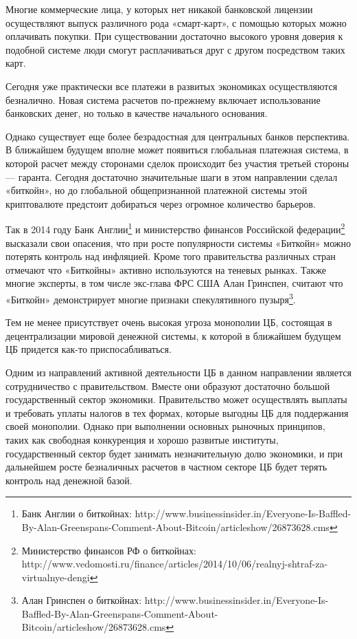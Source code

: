 \documentclass[14pt,a4paper, oneside]{extreport}
\begin{document}
Многие коммерческие лица, у которых нет никакой банковской лицензии осуществляют выпуск различного рода «смарт-карт», с помощью которых можно оплачивать покупки. При существовании достаточно высокого уровня доверия к подобной системе люди смогут расплачиваться друг с другом посредством таких карт.  

Сегодня уже практически все платежи в развитых экономиках осуществляются безналично. Новая система расчетов  по-прежнему включает использование банковских денег, но только в качестве начального основания. 

Однако существует еще более безрадостная для центральных банков перспектива. В ближайшем будущем вполне может появиться глобальная платежная система, в которой расчет между сторонами сделок происходит без участия третьей стороны --- гаранта. Сегодня достаточно значительные шаги в этом направлении сделал «биткойн», но до глобальной общепризнанной платежной системы этой криптовалюте предстоит добираться через огромное количество барьеров.

Так в 2014 году Банк Англии\footnote{ Банк Англии о биткойнах: http://www.businessinsider.in/Everyone-Is-Baffled-By-Alan-Greenspans-Comment-About-Bitcoin/articleshow/26873628.cms} и министерство финансов Российской федерации\footnote{Министерство финансов РФ о биткойнах: http://www.vedomosti.ru/finance/articles/2014/10/06/realnyj-shtraf-za-virtualnye-dengi} высказали свои опасения, что при росте популярности системы «Биткойн»  можно потерять контроль над инфляцией.  Кроме того  правительства различных стран отмечают что «Биткойны» активно используются на теневых рынках. Также многие эксперты, в том числе экс-глава ФРС США Алан Гринспен, считают что «Биткойн» демонстрирует многие признаки спекулятивного пузыря\footnote{Алан Гринспен о биткойнах: http://www.businessinsider.in/Everyone-Is-Baffled-By-Alan-Greenspans-Comment-About-Bitcoin/articleshow/26873628.cms}.

Тем не менее присутствует очень высокая угроза монополии ЦБ, состоящая в децентрализации мировой денежной системы, к которой в ближайшем будущем ЦБ придется как-то приспосабливаться.

Одним из направлений активной деятельности ЦБ в данном направлении является сотрудничество с правительством. Вместе они образуют достаточно большой государственный сектор экономики. Правительство может осуществлять выплаты и требовать уплаты налогов в тех формах, которые выгодны ЦБ для поддержания своей монополии. Однако при выполнении основных рыночных принципов, таких как свободная конкуренция и хорошо развитые институты, государственный сектор будет занимать незначительную долю экономики, и при дальнейшем росте безналичных расчетов в частном секторе ЦБ будет терять контроль над денежной базой. 
\end{document}
